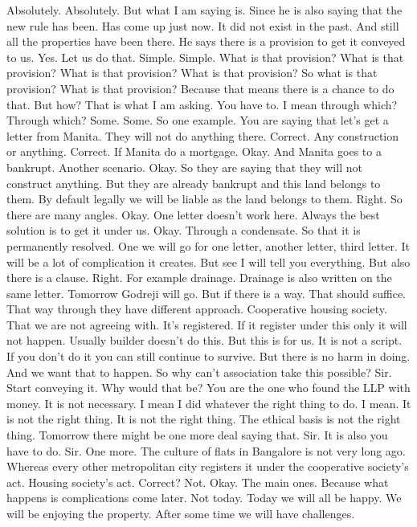 Absolutely.
Absolutely.
But what I am saying is.
Since he is also saying that the new rule has been.
Has come up just now.
It did not exist in the past.
And still all the properties have been there.
He says there is a provision to get it conveyed to us.
Yes.
Let us do that.
Simple.
Simple.
What is that provision?
What is that provision?
What is that provision?
What is that provision?
So what is that provision?
What is that provision?
Because that means there is a chance to do that.
But how?
That is what I am asking.
You have to.
I mean through which?
Through which?
Some.
Some.
So one example.
You are saying that let's get a letter from Manita.
They will not do anything there.
Correct.
Any construction or anything.
Correct.
If Manita do a mortgage.
Okay.
And Manita goes to a bankrupt.
Another scenario.
Okay.
So they are saying that they will not construct anything.
But they are already bankrupt and this land belongs to them.
By default legally we will be liable as the land belongs to them.
Right.
So there are many angles.
Okay.
One letter doesn't work here.
Always the best solution is to get it under us.
Okay.
Through a condensate.
So that it is permanently resolved.
One we will go for one letter, another letter, third letter.
It will be a lot of complication it creates.
But see I will tell you everything.
But also there is a clause.
Right.
For example drainage.
Drainage is also written on the same letter.
Tomorrow Godreji will go.
But if there is a way.
That should suffice.
That way through they have different approach.
Cooperative housing society.
That we are not agreeing with.
It's registered.
If it register under this only it will not happen.
Usually builder doesn't do this.
But this is for us.
It is not a script.
If you don't do it you can still continue to survive.
But there is no harm in doing.
And we want that to happen.
So why can't association take this possible?
Sir.
Start conveying it.
Why would that be?
You are the one who found the LLP with money.
It is not necessary.
I mean I did whatever the right thing to do.
I mean.
It is not the right thing.
It is not the right thing.
The ethical basis is not the right thing.
Tomorrow there might be one more deal saying that.
Sir.
It is also you have to do.
Sir.
One more.
The culture of flats in Bangalore is not very long ago.
Whereas every other metropolitan city registers it under the
cooperative society's act.
Housing society's act.
Correct?
Not.
Okay.
The main ones.
Because what happens is complications come later.
Not today.
Today we will all be happy.
We will be enjoying the property.
After some time we will have challenges.
